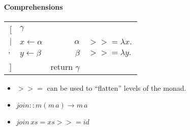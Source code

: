 \documentclass[times, 10pt,twocolumn,preprint]{article}
\theoremstyle{definition}
\newcommand{\LAMBDA}[2]{{\lambda #1.\,#2}}
\newcommand{\bind}{\mathbin{>\!\!>\!\!=}}
\newcommand{\para}[1]{
  \vspace{0.8cm}
  \paragraph{#1}}
\begin{document}
\para{Comprehensions}
\begin{tabular}{rl|rl}
[        & $γ$  &  & \\
$|$    & $x \leftarrow α$  & $ α$ & $\bind{} \LAMBDA x {} $\\
$,$    & $y \leftarrow β$      & $ β$ &  $\bind{} \LAMBDA y {} $ \\
]        &  &  return $γ$ & \\
\end{tabular}


\begin{itemize}
\item $\bind{}$ can be used to ``flatten'' levels of the monad.
\item $join :: m (m\, a)  \to m\, a$
\item $join \, xs = xs \bind{} id$
\end{itemize}
\end{document}
